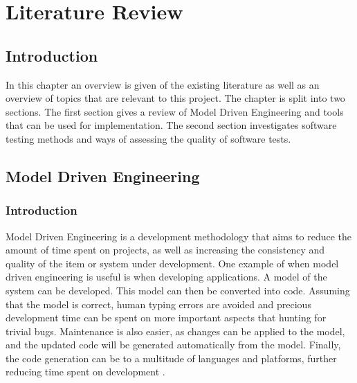 \chapter{Literature Review}

\section{Introduction}
In this chapter an overview is given of the existing literature as well as an overview of topics that are relevant to this project. The chapter is split into two sections. The first section gives a review of Model Driven Engineering and tools that can be used for implementation. The second section investigates software testing methods and ways of assessing the quality of software tests.

\section{Model Driven Engineering}

\subsection{Introduction}
Model Driven Engineering is a development methodology that aims to reduce the amount of time spent on projects, as well as increasing the consistency and quality of the item or system under development. One example of when model driven engineering is useful is when developing applications. A model of the system can be developed. This model can then be converted into code. Assuming that the model is correct, human typing errors are avoided and precious development time can be spent on more important aspects that hunting for trivial bugs. Maintenance is also easier, as changes can be applied to the model, and the updated code will be generated automatically from the model. Finally, the code generation can be to a multitude of languages and platforms, further reducing time spent on development \cite{mdseLano}.


